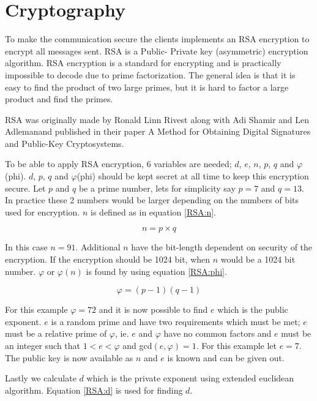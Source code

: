 \section{Cryptography}

To make the communication secure the clients implements an RSA encryption to encrypt all messages sent. RSA is a Public- Private key (asymmetric) encryption algorithm. RSA encryption is a standard for encrypting and is practically impossible to decode due to prime factorization. The general idea is that it is easy to find the product of two large primes, but it is hard to factor a large product and find the primes.

RSA was originally made by Ronald Linn Rivest along with Adi Shamir and Len Adlemanand published in their paper A Method for Obtaining Digital Signatures and Public-Key Cryptosystems\cite{RSA}.

To be able to apply RSA encryption, 6 variables are needed; $d$, $e$, $n$, $p$, $q$ and $\varphi$(phi). $d$, $p$, $q$ and $\varphi$(phi) should be kept secret at all time to keep this encryption secure. Let $p$ and $q$ be a prime number, lets for simplicity say $p=7$ and $q=13$. In practice these 2 numbers would be larger depending on the numbers of bits used for encryption. $n$ is defined as in equation \ref{RSA:n}.

\begin{equation}
n = p \times q
\label{RSA:n}
\end{equation}

In this case $n=91$. Additional $n$ have the bit-length dependent on security of the encryption. If the encryption should be 1024 bit, when $n$ would be a 1024 bit number. $\varphi$ or $\varphi(n)$ is found by using equation \ref{RSA:phi}.

\begin{equation}
\varphi = (p-1)(q-1)
\label{RSA:phi}
\end{equation}

For this example $\varphi = 72$ and it is now possible to find $e$ which is the public exponent. $e$ is a random prime and have two requirements which must be met; $e$ must be a relative prime of $\varphi$, ie. $e$ and $\varphi$ have no common factors and $e$ must be an integer such that $1 < e < \varphi$ and gcd$(e,\varphi)=1$. For this example let $e=7$. The public key is now available as $n$ and $e$ is known and can be given out.

Lastly we calculate $d$ which is the private exponent using extended euclidean algorithm. Equation \ref{RSA:d} is used for finding $d$.


